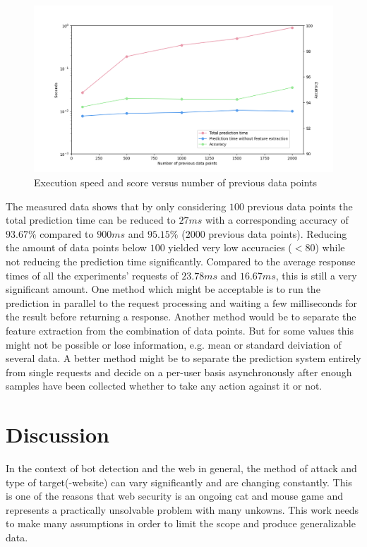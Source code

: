 \documentclass[
    fontsize=12pt,
    headings=small,
    parskip=half,           %
    bibliography=totoc,
    numbers=noenddot,       %
    open=any,               %
    final                   %
]{scrreprt}
\begin{document}
\begin{figure}[h]
	\includegraphics[width=\textwidth]{figures/speed_per_dp_count.png}
	\caption{Execution speed and score versus number of previous data points}
	\label{fig:speed_per_dp_count}
\end{figure}

The measured data shows that by only considering $100$ previous data points the total prediction time can be reduced to $27ms$ with a corresponding accuracy of $93.67\%$ compared to $900ms$ and $95.15\%$ ($2000$ previous data points). Reducing the amount of data points below $100$ yielded very low accuracies ($<80$) while not reducing the prediction time significantly. Compared to the average response times of all the experiments' requests of $23.78ms$ and $16.67ms$, this is still a very significant amount. One method which might be acceptable is to run the prediction in parallel to the request processing and waiting a few milliseconds for the result before returning a response. Another method would be to separate the feature extraction from the combination of data points. But for some values this might not be possible or lose information, e.g. mean or standard deiviation of several data.
A better method might be to separate the prediction system entirely from single requests and decide on a per-user basis asynchronously after enough samples have been collected whether to take any action against it or not.




\chapter{Discussion}
In the context of bot detection and the web in general, the method of attack and type of target(-website) can vary significantly and are changing constantly. This is one of the reasons that web security is an ongoing cat and mouse game and represents a practically unsolvable problem with many unkowns. This work needs to make many assumptions in order to limit the scope and produce generalizable data.
\end{document}
